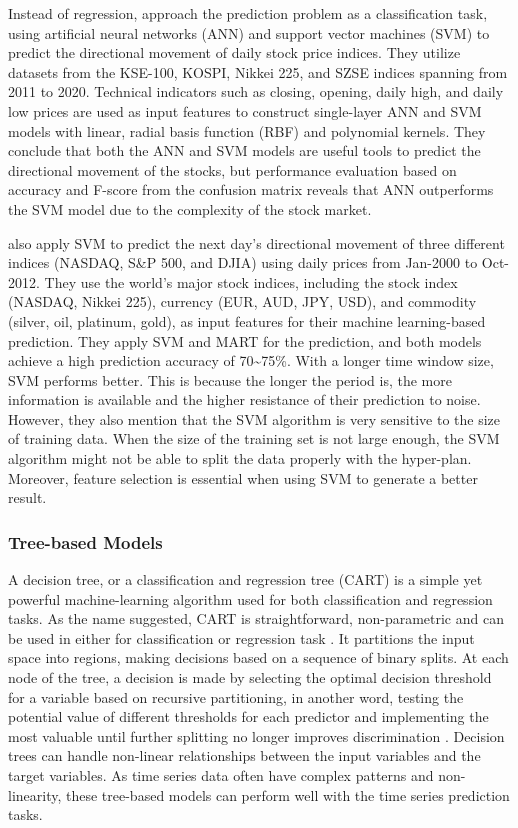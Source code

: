 \documentclass{article}
\begin{document}
Instead of regression, \cite{kara2011predicting} approach the prediction problem as a classification task, using artificial neural networks (ANN) and support vector machines (SVM) to predict the directional movement of daily stock price indices. They utilize datasets from the KSE-100, KOSPI, Nikkei 225, and SZSE indices spanning from 2011 to 2020. Technical indicators such as closing, opening, daily high, and daily low prices are used as input features to construct single-layer ANN and SVM models with linear, radial basis function (RBF) and polynomial kernels. They conclude that both the ANN and SVM models are useful tools to predict the directional movement of the stocks, but performance evaluation based on accuracy and F-score from the confusion matrix reveals that ANN outperforms the SVM model due to the complexity of the stock market. 

\cite{shen2012stock} also apply SVM to predict the next day's directional movement of three different indices (NASDAQ, S\&P 500, and DJIA) using daily prices from Jan-2000 to Oct-2012. They use the world's major stock indices, including the stock index (NASDAQ, Nikkei 225), currency (EUR, AUD, JPY, USD), and commodity (silver, oil, platinum, gold), as input features for their machine learning-based prediction. They apply SVM and MART for the prediction, and both models achieve a high prediction accuracy of 70\textasciitilde 75\%. With a longer time window size, SVM performs better. This is because the longer the period is, the more information is available and the higher resistance of their prediction to noise. However, they also mention that the SVM algorithm is very sensitive to the size of training data. When the size of the training set is not large enough, the SVM algorithm might not be able to split the data properly with the hyper-plan. Moreover, feature selection is essential when using SVM to generate a better result.

\subsubsection{Tree-based Models}
A decision tree, or a classification and regression tree (CART) is a simple yet powerful machine-learning algorithm used for both classification and regression tasks. As the name suggested, CART is straightforward, non-parametric and can be used in either for classification or regression task \citep{rigatti2017random}. It partitions the input space into regions, making decisions based on a sequence of binary splits. At each node of the tree, a decision is made by selecting the optimal decision threshold for a variable based on recursive partitioning, in another word, testing the potential value of different thresholds for each predictor and implementing the most valuable until further splitting no longer improves discrimination \citep{song2015decision, yamada2003decision}. Decision trees can handle non-linear relationships between the input variables and the target variables. As time series data often have complex patterns and non-linearity, these tree-based models can perform well with the time series prediction tasks. 
\end{document}
